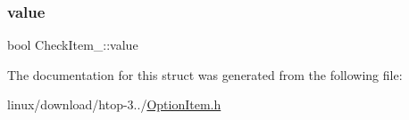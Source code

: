 \mbox{\label{structCheckItem___ab0316f626cd4fab59ba1f1abfd5406cf}} 
\subsubsection{\texorpdfstring{value}{value}}
{\footnotesize\ttfamily bool Check\+Item\+\_\+\+::value}



The documentation for this struct was generated from the following file\+:\begin{DoxyCompactItemize}
\item 
linux/download/htop-\/3../\hyperlink{OptionItem_8h}{Option\+Item.\+h}\end{DoxyCompactItemize}
